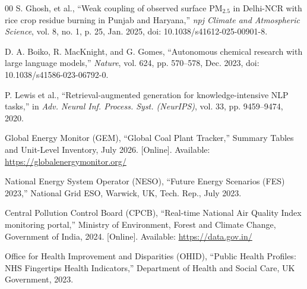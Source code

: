 \documentclass[conference]{IEEEtran}
\renewcommand{\_}{\textunderscore\allowbreak{}}%
\begin{document}
\begin{thebibliography}{00}
S. Ghosh, et al., ``Weak coupling of observed surface $\text{PM}_{2.5}$ in Delhi-NCR with rice crop residue burning in Punjab and Haryana,'' \textit{npj Climate and Atmospheric Science}, vol. 8, no. 1, p. 25, Jan. 2025, doi: 10.1038/s41612-025-00901-8.

D. A. Boiko, R. MacKnight, and G. Gomes, ``Autonomous chemical research with large language models,'' \textit{Nature}, vol. 624, pp. 570--578, Dec. 2023, doi: 10.1038/s41586-023-06792-0.

P. Lewis et al., ``Retrieval-augmented generation for knowledge-intensive NLP tasks,'' in \textit{Adv. Neural Inf. Process. Syst. (NeurIPS)}, vol. 33, pp. 9459--9474, 2020.

Global Energy Monitor (GEM), ``Global Coal Plant Tracker,'' Summary Tables and Unit-Level Inventory, July 2026. [Online]. Available: \url{https://globalenergymonitor.org/}

National Energy System Operator (NESO), ``Future Energy Scenarios (FES) 2023,'' National Grid ESO, Warwick, UK, Tech. Rep., July 2023.

Central Pollution Control Board (CPCB), ``Real-time National Air Quality Index monitoring portal,'' Ministry of Environment, Forest and Climate Change, Government of India, 2024. [Online]. Available: \url{https://data.gov.in/}

Office for Health Improvement and Disparities (OHID), ``Public Health Profiles: NHS Fingertips Health Indicators,'' Department of Health and Social Care, UK Government, 2023.

\end{thebibliography}
\end{document}
